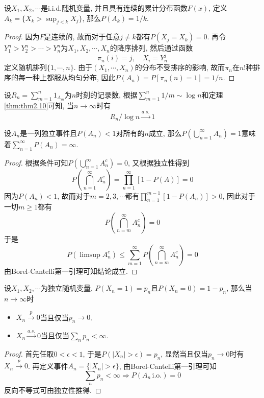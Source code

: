 \documentclass[cn, 12pt, math=mtpro2, bibstyle=apa, blue, twocol]{elegantbook}
\begin{document}
\begin{example}[记录值]
设$X_1,X_2,\cdots$是i.i.d.随机变量, 并且具有连续的累计分布函数$F(x)$, 定义$A_k=\{X_k>\sup_{j<k}X_j\}$, 那么$P(A_k)=1/k$.
\end{example}
\begin{proof}
  因为$F$是连续的, 故而对于任意$j\neq k$都有$P(X_j=X_k)=0$. 再令$Y_1^n>Y_2^n>\cdots >Y_n^n$为$X_1,X_2,\cdots,X_n$的降序排列, 然后通过函数
  $$\pi_n(i)=j,\quad X_i=Y_n^j$$
  定义随机排列$\{1,\cdots,n\}$. 由于$(X_1,\cdots,X_n)$的分布不受排序的影响, 故而$\pi_n$在$n!$种排序的每一种上都服从均匀分布, 因此$P(A_n)=P[\pi_n(n)=1]=1/n$.
\end{proof}
\begin{remark}
  设$R_n=\sum_{m=1}^{n}1_{A_m}$为$n$时刻的记录数, 根据$\sum_{m=1}^{n}1/m\sim \log n$和定理\ref{thm:thm2.10}可知, 当$n\to\infty$时有
  $$R_n/\log n\xrightarrow{a.s.}1$$
\end{remark}


\begin{example}
设$A_n$是一列独立事件且$P(A_n)<1$对所有的$n$成立, 那么$P(\bigcup_{n=1}^\infty A_n)=1$意味着$\sum_{n=1}^{\infty} P(A_n)=\infty$.
\end{example}
\begin{proof}
  根据条件可知$P(\bigcup_{n=1}^\infty A_n^c)=0$, 又根据独立性得到
  $$P\left(\bigcap_{n=1}^\infty A_n^c\right)=\prod_{n=1}^{\infty}[1-P(A)]=0$$
  因为$P(A_n)<1$, 故而对于$m=2,3,\cdots$都有$\prod_{n=1}^{m-1}[1-P(A_n)]>0$, 因此对于一切$m\ge1$都有
  $$P\left(\bigcap_{n=m}^\infty A_n^c\right)=0$$
  于是
  $$P(\limsup A_n^c)\leq \sum_{m=1}^{\infty}P\left(\bigcap_{n=m}^\infty A_n^c\right)=0$$
  由Borel-Cantelli第一引理可知结论成立.
\end{proof}
\begin{example}
  设$X_1,X_2,\cdots$为独立随机变量, $P(X_n=1)=p_n$且$P(X_n=0)=1-p_n$, 那么当$n\to\infty$时
  \begin{itemize}
    \item $X_n\xrightarrow{p}0$当且仅当$p_n\to0$.
    \item $X_n\xrightarrow{a.s.}0$当且仅当$\sum_n p_n<\infty$.
  \end{itemize}
\end{example}
\begin{proof}
  首先任取$0<\epsilon<1$, 于是$P(|X_n|>\epsilon)=p_n$, 显然当且仅当$p_n\to0$时有$X_n\xrightarrow{p}0$. 再定义事件$A_n=\{|X_n|>\epsilon\}$, 由Borel-Cantelli第一引理可知
  $$\sum_np_n<\infty \Rightarrow P(A_n\,\text{i.o.})=0$$
  反向不等式可由独立性推得.
\end{proof}
\end{document}

